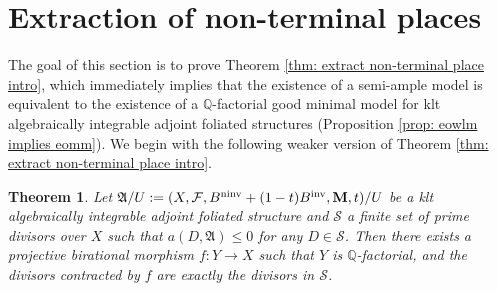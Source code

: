 \documentclass[12pt]{amsart}
\numberwithin{equation}{section}
\newcommand{\Mm}{{\bf{M}}}
\newcommand{\ninv}{\operatorname{ninv}}
\newcommand{\inv}{\operatorname{inv}}
\newcommand{\Aa}{{\mathfrak{A}}}
\newcommand{\Ff}{\mathcal{F}}
\newtheorem{thm}{Theorem}[section]
\theoremstyle{definition}
\theoremstyle{definition}
\theoremstyle{definition}
\begin{document}
\section{Extraction of non-terminal places}\label{sec: extract non-terminal place}

The goal of this section is to prove Theorem \ref{thm: extract non-terminal place intro}, which immediately implies that the existence of a semi-ample model is equivalent to the existence of a $\mathbb Q$-factorial good minimal model for klt algebraically integrable adjoint foliated structures (Proposition \ref{prop: eowlm implies eomm}). We begin with the following weaker version of Theorem \ref{thm: extract non-terminal place intro}.


\begin{thm}\label{thm: extract non-terminal places}
    Let $\Aa/U:=(X,\Ff,B^{\ninv}+(1-t)B^{\inv},\Mm,t)/U$ be a klt algebraically integrable adjoint foliated structure and $\mathcal{S}$ a finite set of prime divisors over $X$ such that $a(D,\Aa)\leq 0$ for any $D\in\mathcal{S}$. Then there exists a projective birational morphism $f: Y\rightarrow X$ such that $Y$ is $\mathbb Q$-factorial, and the divisors contracted by $f$ are exactly the divisors in $\mathcal{S}$.
\end{thm}
\end{document}
